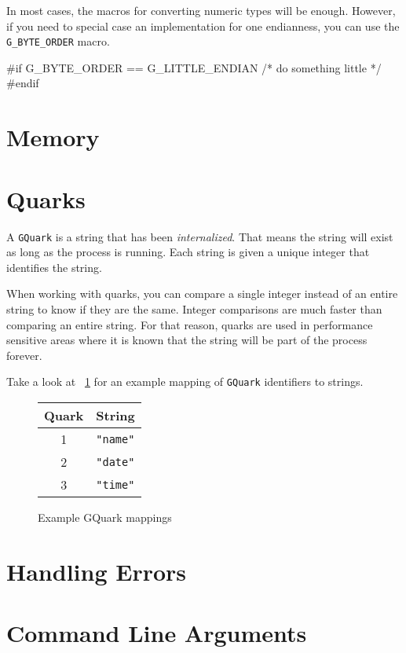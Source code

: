 In most cases, the macros for converting numeric types will be enough.
However, if you need to special case an implementation for one endianness, you can use the \verb|G_BYTE_ORDER| macro.

\begin{code}{}
#if G_BYTE_ORDER == G_LITTLE_ENDIAN
    /* do something little */
#endif
\end{code}

\section{Memory}

\section{Quarks}

A \verb|GQuark| is a string that has been \emph{internalized}.
That means the string will exist as long as the process is running.
Each string is given a unique integer that identifies the string.

When working with quarks, you can compare a single integer instead of an entire string to know if they are the same.
Integer comparisons are much faster than comparing an entire string.
For that reason, quarks are used in performance sensitive areas where it is known that the string will be part of the process forever.

Take a look at ~\ref{fig:quarks} for an example mapping of \verb|GQuark| identifiers to strings.

\begin{figure}[h!]
\centering
\begin{tabular}{c | l}
Quark & String \\
\hline
1 & \verb|"name"| \\
2 & \verb|"date"| \\
3 & \verb|"time"| \\
\end{tabular}
\caption{Example GQuark mappings}
\label{fig:quarks}
\end{figure}

\section{Handling Errors}

\section{Command Line Arguments}
